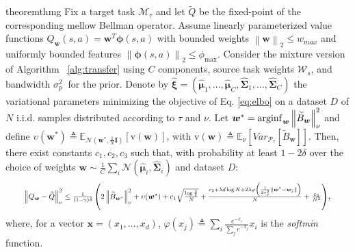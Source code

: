 \documentclass{article}
\newcommand{\arginf}{\operatornamewithlimits{arginf}}
\newcommand{\wt}[1]{\widetilde{#1}}
\newcommand{\wh}[1]{\widehat{#1}}
\newcommand{\norm}[1]{\left\lVert #1 \right\rVert}
\begin{document}
\begin{restatable}{theorem}{thmg} \label{th:main-mixture}
Fix a target task $\mathcal{M}_{\tau}$ and let $\wt{Q}$ be the fixed-point of the corresponding mellow Bellman operator. Assume linearly parameterized value functions $Q_{\bm{w}}(s,a)=\bm{w}^T\bm{\phi}(s,a)$ with bounded weights $\norm{\bm{w}}_2\leq w_{max}$ and uniformly bounded features $\norm{\bm{\phi}(s,a)}_2\leq \phi_{\max}$. Consider the mixture version of Algorithm~ \ref{alg:transfer} using $C$ components, source task weights $\mathcal{W}_s$, and bandwidth $\sigma^2_p\ $ for the prior. Denote by $\wh{\bm{\xi}} = (\wh{\bm{\mu}}_1,\dots,\wh{\bm{\mu}}_C,\wh{\bm{\Sigma}}_1,\dots,\wh{\bm{\Sigma}}_C)$ the variational parameters minimizing the objective of Eq. \eqref{eq:elbo} on a dataset $D$ of $N$ i.i.d. samples distributed according to $\tau$ and $\nu$. Let $\bm{w}^* = \arginf_{\bm{w}}\norm{\wt{B}_{\bm{w}}}_{\nu}^2$ and define $\upsilon(\bm{w}^*) \triangleq \mathbb{E}_{\mathcal{N}(\bm{w}^*,\frac{1}{N}\bm{I})}\left[ \text{v}(\bm{w}) \right]$, with $\text{v}(\bm{w}) \triangleq \mathbb{E}_{\nu}\left[Var_{\mathcal{P}_{\tau}}\left[\wt B_{\bm{w}}\right]\right]$. Then, there exist constants $c_1,c_2,c_3$ such that, with probability at least $1-2\delta$ over the choice of weights $\bm{w} \sim \frac{1}{C}\sum_i\mathcal{N}(\wh{\bm{\mu}}_i,\wh{\bm{\Sigma}}_i)$ and dataset $D$:
\begin{equation}
\resizebox{0.92\textwidth}{!}{$
\norm{Q_{\bm{w}} - \wt{Q}}_{\nu}^2 \leq \frac{1}{(1-\gamma)\delta}\left(2\norm{\wt{B}_{\bm{w}^{*}}}_{\nu}^2 + \upsilon(\bm{w}^*) + c_1\sqrt{\frac{\log\frac{2}{\delta}}{N}}  + \frac{c_2 +  \lambda d \log N + 2\lambda\varphi\left(\frac{1}{2\sigma^2_p}\norm{\bm{w}^* - \bm{w}_j}\right)}{N} + \frac{c_3}{N^2}\right)$},
\end{equation}
where, for a vector $\bm{x} = (x_1,\dots,x_d)$, $\varphi \left( x_j\right) \triangleq \sum_i \frac{e^{-x_i}}{\sum_j e^{-x_j}}x_i$ is the \textit{softmin} function.
\end{restatable}
\end{document}
